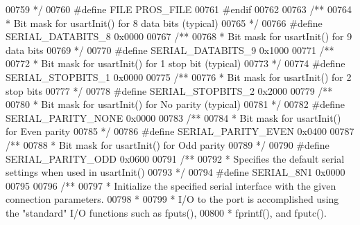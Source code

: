 \begin{DoxyCode}
00759 \textcolor{comment}{ */}
00760 \textcolor{preprocessor}{#}\textcolor{preprocessor}{define} \textcolor{preprocessor}{FILE} \textcolor{preprocessor}{PROS\_FILE}
00761 \textcolor{preprocessor}{#}\textcolor{preprocessor}{endif}
00762 
00763 \textcolor{comment}{/**}
00764 \textcolor{comment}{ * Bit mask for usartInit() for 8 data bits (typical)}
00765 \textcolor{comment}{ */}
00766 \textcolor{preprocessor}{#}\textcolor{preprocessor}{define} \textcolor{preprocessor}{SERIAL\_DATABITS\_8} 0x0000
00767 \textcolor{comment}{/**}
00768 \textcolor{comment}{ * Bit mask for usartInit() for 9 data bits}
00769 \textcolor{comment}{ */}
00770 \textcolor{preprocessor}{#}\textcolor{preprocessor}{define} \textcolor{preprocessor}{SERIAL\_DATABITS\_9} 0x1000
00771 \textcolor{comment}{/**}
00772 \textcolor{comment}{ * Bit mask for usartInit() for 1 stop bit (typical)}
00773 \textcolor{comment}{ */}
00774 \textcolor{preprocessor}{#}\textcolor{preprocessor}{define} \textcolor{preprocessor}{SERIAL\_STOPBITS\_1} 0x0000
00775 \textcolor{comment}{/**}
00776 \textcolor{comment}{ * Bit mask for usartInit() for 2 stop bits}
00777 \textcolor{comment}{ */}
00778 \textcolor{preprocessor}{#}\textcolor{preprocessor}{define} \textcolor{preprocessor}{SERIAL\_STOPBITS\_2} 0x2000
00779 \textcolor{comment}{/**}
00780 \textcolor{comment}{ * Bit mask for usartInit() for No parity (typical)}
00781 \textcolor{comment}{ */}
00782 \textcolor{preprocessor}{#}\textcolor{preprocessor}{define} \textcolor{preprocessor}{SERIAL\_PARITY\_NONE} 0x0000
00783 \textcolor{comment}{/**}
00784 \textcolor{comment}{ * Bit mask for usartInit() for Even parity}
00785 \textcolor{comment}{ */}
00786 \textcolor{preprocessor}{#}\textcolor{preprocessor}{define} \textcolor{preprocessor}{SERIAL\_PARITY\_EVEN} 0x0400
00787 \textcolor{comment}{/**}
00788 \textcolor{comment}{ * Bit mask for usartInit() for Odd parity}
00789 \textcolor{comment}{ */}
00790 \textcolor{preprocessor}{#}\textcolor{preprocessor}{define} \textcolor{preprocessor}{SERIAL\_PARITY\_ODD} 0x0600
00791 \textcolor{comment}{/**}
00792 \textcolor{comment}{ * Specifies the default serial settings when used in usartInit()}
00793 \textcolor{comment}{ */}
00794 \textcolor{preprocessor}{#}\textcolor{preprocessor}{define} \textcolor{preprocessor}{SERIAL\_8N1} 0x0000
00795 
00796 \textcolor{comment}{/**}
00797 \textcolor{comment}{ * Initialize the specified serial interface with the given connection parameters.}
00798 \textcolor{comment}{ *}
00799 \textcolor{comment}{ * I/O to the port is accomplished using the "standard" I/O functions such as fputs(),}
00800 \textcolor{comment}{ * fprintf(), and fputc().}

\end{DoxyCode}
